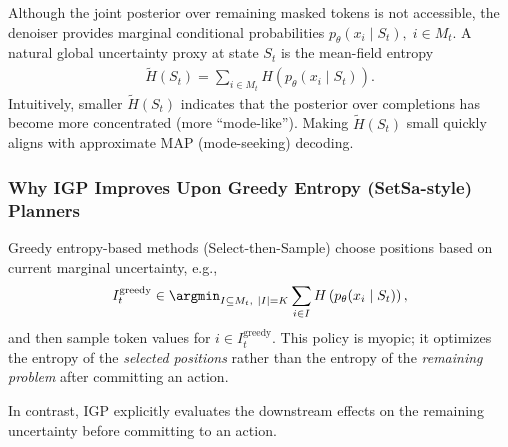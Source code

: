 Although the joint posterior over remaining masked tokens is not accessible, the denoiser provides marginal conditional probabilities $p_\theta(x_i \mid S_t), \; i\in M_t$. A natural global uncertainty proxy at state $S_t$ is the mean-field entropy
\begin{align}
\tilde H(S_t) = \sum_{i\in M_t} H\left(p_\theta(x_i \mid S_t)\right).
\end{align}
Intuitively, smaller $\tilde H(S_t)$ indicates that the posterior over completions has become more concentrated (more ``mode-like''). Making $\tilde H(S_t)$ small quickly aligns with approximate MAP (mode-seeking) decoding.


\subsubsection{Why IGP Improves Upon Greedy Entropy (SetSa-style) Planners}
Greedy entropy-based methods (Select-then-Sample) choose positions based on current marginal uncertainty, e.g.,
\begin{align}
I_t^{\text{greedy}} \in \argmin_{I\subseteq M_t,\ |I|=K}\sum_{i\in I} H\left(p_\theta(x_i \mid S_t)\right),
\end{align}
and then sample token values for $i\in I_t^{\text{greedy}}$. This policy is myopic; it optimizes the entropy of the \emph{selected positions} rather than the entropy of the \emph{remaining problem} after committing an action.

In contrast, IGP explicitly evaluates the downstream effects on the remaining uncertainty before committing to an action.

